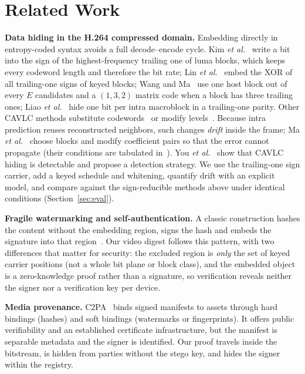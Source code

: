 \section{Related Work}
\label{sec:related}

\textbf{Data hiding in the H.264 compressed domain.} Embedding directly in entropy-coded syntax avoids a full decode--encode cycle. Kim \emph{et al.}~\cite{kim2007t1} write a bit into the sign of the highest-frequency trailing one of luma blocks, which keeps every codeword length and therefore the bit rate; Lin \emph{et al.}~\cite{lin2012cavlc} embed the XOR of all trailing-one signs of keyed blocks; Wang and Ma~\cite{wang2018cavlc} use one host block out of every $E$ candidates and a $(1,3,2)$ matrix code when a block has three trailing ones; Liao \emph{et al.}~\cite{liao2009t1,liao2012t1journal} hide one bit per intra macroblock in a trailing-one parity. Other CAVLC methods substitute codewords~\cite{mobasseri2007} or modify levels~\cite{fragile_h264_mtap}. Because intra prediction reuses reconstructed neighbors, such changes \emph{drift} inside the frame; Ma \emph{et al.}~\cite{ma2010drift} choose blocks and modify coefficient pairs so that the error cannot propagate (their conditions are tabulated in~\cite{nguyen2022drift}). You \emph{et al.}~\cite{you2017cavlc} show that CAVLC hiding is detectable and propose a detection strategy. We use the trailing-one sign carrier, add a keyed schedule and whitening, quantify drift with an explicit model, and compare against the sign-reducible methods above under identical conditions (Section~\ref{sec:eval}).

\textbf{Fragile watermarking and self-authentication.} A classic construction hashes the content without the embedding region, signs the hash and embeds the signature into that region~\cite{yeung1997,wong1998}. Our video digest follows this pattern, with two differences that matter for security: the excluded region is \emph{only} the set of keyed carrier positions (not a whole bit plane or block class), and the embedded object is a zero-knowledge proof rather than a signature, so verification reveals neither the signer nor a verification key per device.

\textbf{Media provenance.} C2PA~\cite{c2pa_spec} binds signed manifests to assets through hard bindings (hashes) and soft bindings (watermarks or fingerprints). It offers public verifiability and an established certificate infrastructure, but the manifest is separable metadata and the signer is identified. Our proof travels inside the bitstream, is hidden from parties without the stego key, and hides the signer within the registry.

